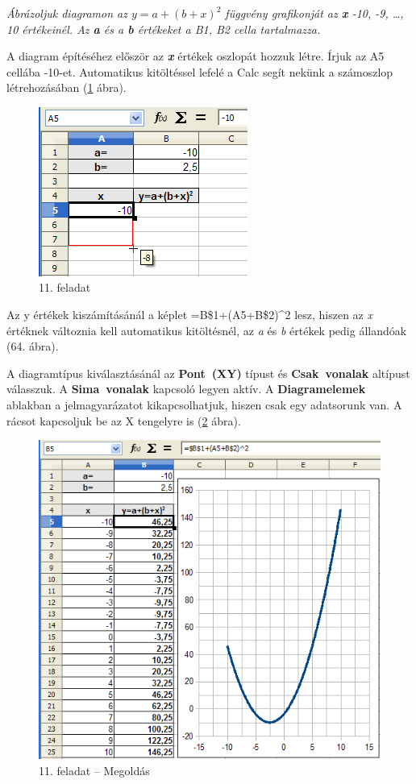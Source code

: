 {\itshape
Ábrázoljuk diagramon az  $y=a+(b+x)^{2}$ függvény grafikonját
az \textbf{x} -10, -9, {\dots}, 10 értékeinél. Az \textbf{a} és
a \textbf{b} értékeket a B1, B2 cella tartalmazza.}

A diagram építéséhez először az \textbf{\textit{x}}
értékek oszlopát hozzuk létre. Írjuk az A5 cellába -10-et.
Automatikus kitöltéssel lefelé a Calc segít nekünk a
számoszlop létrehozásában (\ref{11-feladat} ábra).

\begin{figure}[!h]
\begin{center}
\includegraphics[width=6.851cm]{oocalcv1-img64.png}
\caption{11. feladat}\label{11-feladat}
\end{center}
\end{figure}

Az y értékek kiszámításánál a képlet
=B\$1+(A5+B\$2)\^{}2 lesz, hiszen az \textit{x} értéknek
változnia kell automatikus kitöltésnél, az \textit{a} és
\textit{b} értékek pedig állandóak (64. ábra).

A diagramtípus kiválasztásánál az \textbf{Pont~(XY)} típust
és \textbf{Csak~vonalak} altípust válasszuk. A
\textbf{Sima~vonalak }kapcsoló legyen aktív. A
\textbf{Diagramelemek} ablakban a jelmagyarázatot kikapcsolhatjuk,
hiszen csak egy adatsorunk van.  A rácsot kapcsoljuk be az X
tengelyre is (\ref{11-feladatMegoldás} ábra).

\begin{figure}[!h]
\begin{center}
\includegraphics[width=12.458cm]{oocalcv1-img65.png}
\caption{11. feladat -- Megoldás}\label{11-feladatMegoldás}
\end{center}
\end{figure}

